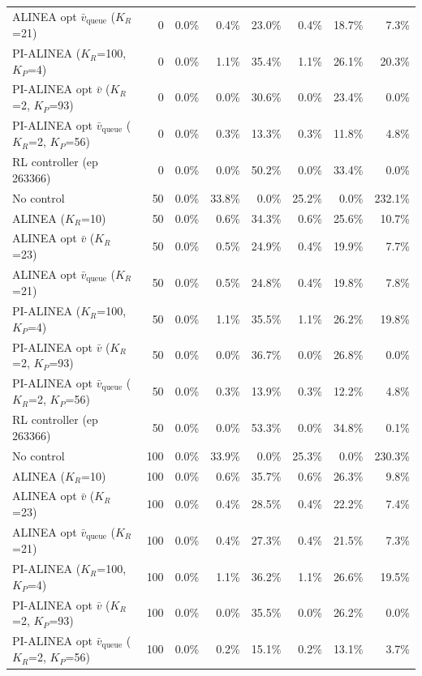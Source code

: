 \begin{longtable}{p{5.2cm}rrrrrrr}
ALINEA opt $\bar{v}_{\mathrm{queue}}$ ($K_R$=21) & 0 & 0.0\% & 0.4\% & 23.0\% & 0.4\% & 18.7\% & 7.3\% \\
PI-ALINEA ($K_R$=100, $K_P$=4) & 0 & 0.0\% & 1.1\% & 35.4\% & 1.1\% & 26.1\% & 20.3\% \\
PI-ALINEA opt $\bar{v}$ ($K_R$=2, $K_P$=93) & 0 & 0.0\% & 0.0\% & 30.6\% & 0.0\% & 23.4\% & 0.0\% \\
PI-ALINEA opt $\bar{v}_{\mathrm{queue}}$ ($K_R$=2, $K_P$=56) & 0 & 0.0\% & 0.3\% & 13.3\% & 0.3\% & 11.8\% & 4.8\% \\
RL controller (ep 263366) & 0 & 0.0\% & 0.0\% & 50.2\% & 0.0\% & 33.4\% & 0.0\% \\
\midrule
No control & 50 & 0.0\% & 33.8\% & 0.0\% & 25.2\% & 0.0\% & 232.1\% \\
ALINEA ($K_R$=10) & 50 & 0.0\% & 0.6\% & 34.3\% & 0.6\% & 25.6\% & 10.7\% \\
ALINEA opt $\bar{v}$ ($K_R$=23) & 50 & 0.0\% & 0.5\% & 24.9\% & 0.4\% & 19.9\% & 7.7\% \\
ALINEA opt $\bar{v}_{\mathrm{queue}}$ ($K_R$=21) & 50 & 0.0\% & 0.5\% & 24.8\% & 0.4\% & 19.8\% & 7.8\% \\
PI-ALINEA ($K_R$=100, $K_P$=4) & 50 & 0.0\% & 1.1\% & 35.5\% & 1.1\% & 26.2\% & 19.8\% \\
PI-ALINEA opt $\bar{v}$ ($K_R$=2, $K_P$=93) & 50 & 0.0\% & 0.0\% & 36.7\% & 0.0\% & 26.8\% & 0.0\% \\
PI-ALINEA opt $\bar{v}_{\mathrm{queue}}$ ($K_R$=2, $K_P$=56) & 50 & 0.0\% & 0.3\% & 13.9\% & 0.3\% & 12.2\% & 4.8\% \\
RL controller (ep 263366) & 50 & 0.0\% & 0.0\% & 53.3\% & 0.0\% & 34.8\% & 0.1\% \\
\midrule
No control & 100 & 0.0\% & 33.9\% & 0.0\% & 25.3\% & 0.0\% & 230.3\% \\
ALINEA ($K_R$=10) & 100 & 0.0\% & 0.6\% & 35.7\% & 0.6\% & 26.3\% & 9.8\% \\
ALINEA opt $\bar{v}$ ($K_R$=23) & 100 & 0.0\% & 0.4\% & 28.5\% & 0.4\% & 22.2\% & 7.4\% \\
ALINEA opt $\bar{v}_{\mathrm{queue}}$ ($K_R$=21) & 100 & 0.0\% & 0.4\% & 27.3\% & 0.4\% & 21.5\% & 7.3\% \\
PI-ALINEA ($K_R$=100, $K_P$=4) & 100 & 0.0\% & 1.1\% & 36.2\% & 1.1\% & 26.6\% & 19.5\% \\
PI-ALINEA opt $\bar{v}$ ($K_R$=2, $K_P$=93) & 100 & 0.0\% & 0.0\% & 35.5\% & 0.0\% & 26.2\% & 0.0\% \\
PI-ALINEA opt $\bar{v}_{\mathrm{queue}}$ ($K_R$=2, $K_P$=56) & 100 & 0.0\% & 0.2\% & 15.1\% & 0.2\% & 13.1\% & 3.7\% \\

\end{longtable}
